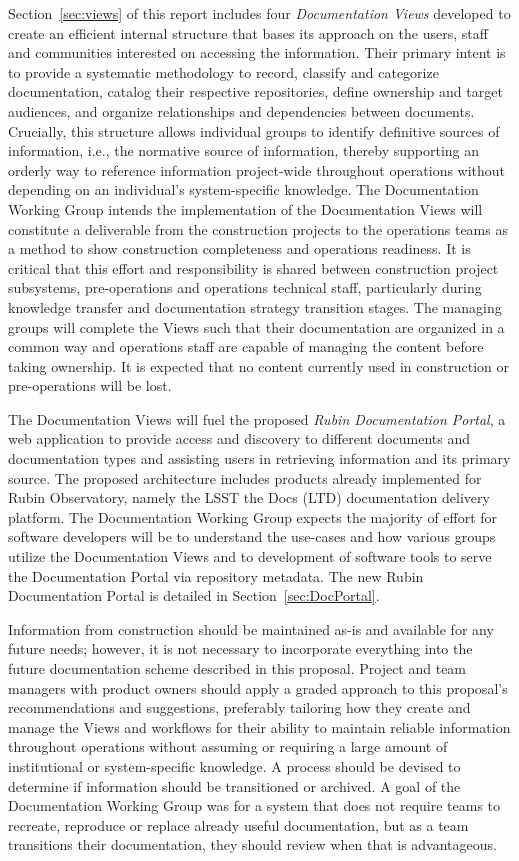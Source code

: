 Section~\ref{sec:views} of this report includes four \emph{Documentation Views} developed to create an efficient internal structure that bases its approach on the users, staff and communities interested on accessing the information.
Their primary intent is to provide a systematic methodology to record, classify and categorize documentation, catalog their respective repositories, define ownership and target audiences, and organize relationships and dependencies between documents.
Crucially, this structure allows individual groups to identify definitive sources of information, i.e., the normative source of information, thereby supporting an orderly way to reference information project-wide throughout operations without depending on an individual's system-specific knowledge.
The Documentation Working Group intends the implementation of the Documentation Views will constitute a deliverable from the construction projects to the operations teams as a method to show construction completeness and operations readiness.
It is critical that this effort and responsibility is shared between construction project subsystems, pre-operations and operations technical staff, particularly during knowledge transfer and documentation strategy transition stages.
The managing groups will complete the Views such that their documentation are organized in a common way and operations staff are capable of managing the content before taking ownership.
It is expected that no content currently used in construction or pre-operations will be lost.

The Documentation Views will fuel the proposed \emph{Rubin Documentation Portal}, a web application to provide access and discovery to different documents and documentation types and assisting users in retrieving information and its primary source.
The proposed architecture includes products already implemented for Rubin Observatory, namely the LSST the Docs (LTD) documentation delivery platform. 
The Documentation Working Group expects the majority of effort for software developers will be to understand the use-cases and how various groups utilize the Documentation Views and to development of software tools to serve the Documentation Portal via repository metadata.
The new Rubin Documentation Portal is detailed in Section~\ref{sec:DocPortal}.

Information from construction should be maintained as-is and available for any future needs; however, it is not necessary to incorporate everything into the future documentation scheme described in this proposal.
Project and team managers with product owners should apply a graded approach to this proposal's recommendations and suggestions, preferably tailoring how they create and manage the Views and workflows for their ability to maintain reliable information throughout operations without assuming or requiring a large amount of institutional or system-specific knowledge. 
A process should be devised to determine if information should be transitioned or archived.
A goal of the Documentation Working Group was for a system that does not require teams to recreate, reproduce or replace already useful documentation, but as a team transitions their documentation, they should review when that is advantageous.

